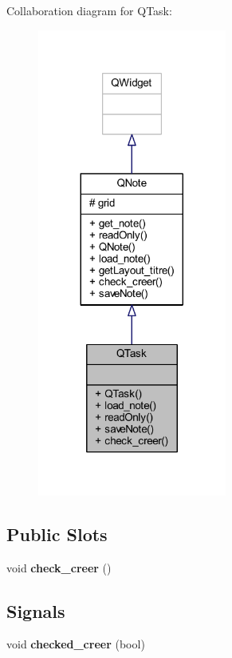 Collaboration diagram for Q\+Task\+:
\nopagebreak
\begin{figure}[H]
\begin{center}
\leavevmode
\includegraphics[width=176pt]{class_q_task__coll__graph}
\end{center}
\end{figure}
\subsection*{Public Slots}
\begin{DoxyCompactItemize}
\item 
\mbox{\label{class_q_task_a9ee271061467da09180f8106734bb327}} 
void {\bfseries check\+\_\+creer} ()
\end{DoxyCompactItemize}
\subsection*{Signals}
\begin{DoxyCompactItemize}
\item 
\mbox{\label{class_q_task_a21a78164df191b35a712ccb43c6bc7e2}} 
void {\bfseries checked\+\_\+creer} (bool)
\end{DoxyCompactItemize}
